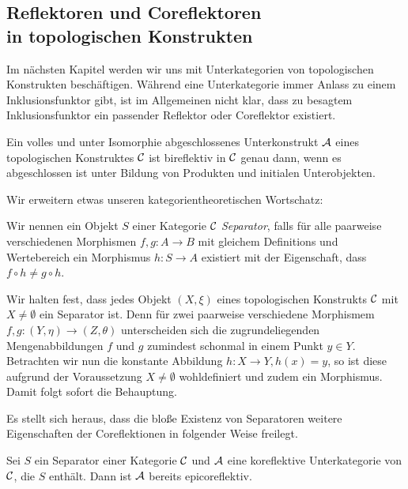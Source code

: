 \subsection{Reflektoren und Coreflektoren\\ in topologischen Konstrukten}

Im nächsten Kapitel werden wir uns mit Unterkategorien von topologischen Konstrukten beschäftigen. Während eine Unterkategorie immer Anlass zu einem Inklusionsfunktor gibt, ist im Allgemeinen nicht klar, dass zu besagtem Inklusionsfunktor ein passender Reflektor oder Coreflektor existiert. 

\begin{kor}
  Ein volles und unter Isomorphie abgeschlossenes Unterkonstrukt $\mathcal{A}$ eines topologischen Konstruktes $\mathcal{C}$ ist bireflektiv in $\mathcal{C}$ genau dann, wenn es abgeschlossen ist unter Bildung von Produkten und initialen Unterobjekten.
\end{kor}

Wir erweitern etwas unseren kategorientheoretischen Wortschatz:

\begin{defn}
  Wir nennen ein Objekt $S$ einer Kategorie $\mathcal{C}$ \emph{Separator}, falls für alle paarweise verschiedenen Morphismen $f,g \colon A \to B$ mit gleichem Definitions und Wertebereich ein Morphismus $h \colon S \to A$ existiert mit der Eigenschaft, dass $f \circ h \neq g \circ h$.
\end{defn}

Wir halten fest, dass jedes Objekt $(X,\xi)$ eines topologischen Konstrukts $\mathcal{C}$ mit $X \neq \emptyset$ ein Separator ist. 
Denn für zwei paarweise verschiedene Morphismem $f,g \colon (Y, \eta) \to (Z, \theta)$ unterscheiden sich die zugrundeliegenden Mengenabbildungen $f$ und $g$ zumindest schonmal in einem Punkt $y \in Y$. Betrachten wir nun die konstante Abbildung $h \colon X \to Y, h(x) = y$, so ist diese aufgrund der Voraussetzung $X \neq \emptyset$ wohldefiniert und zudem ein Morphismus.
Damit folgt sofort die Behauptung.

Es stellt sich heraus, dass die bloße Existenz von Separatoren weitere Eigenschaften der Coreflektionen in folgender Weise freilegt.

\begin{thm}
  Sei $S$ ein Separator einer Kategorie $\mathcal{C}$ und $\mathcal{A}$ eine koreflektive Unterkategorie von $\mathcal{C}$, die $S$ enthält.
  Dann ist $\mathcal{A}$ bereits epicoreflektiv.
\end{thm}

